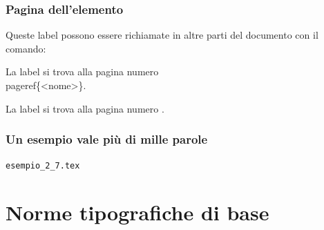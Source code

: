 \documentclass[svgnames,%
	ucs,%
	pdftex]{guitbeamer}
\begin{document}
\begin{frame}
  \frametitle{Pagina dell'elemento}
	Queste label possono essere richiamate in altre parti del documento
	con il comando:
	\begin{LaTeXcode}
		La label si trova alla pagina numero \alert{\\pageref\{<nome>\}}.
	\end{LaTeXcode}
	\begin{LaTeXoutput}
		La label si trova alla pagina numero \pageref{nome}.
	\end{LaTeXoutput}
\end{frame}
\begin{frame}
  \frametitle{Un esempio vale pi\`u di mille parole}
	\begin{center}
		\alert{\texttt{esempio\_2\_7.tex}}
	\end{center}
\end{frame}
\section{Norme tipografiche di base}
\end{document}
